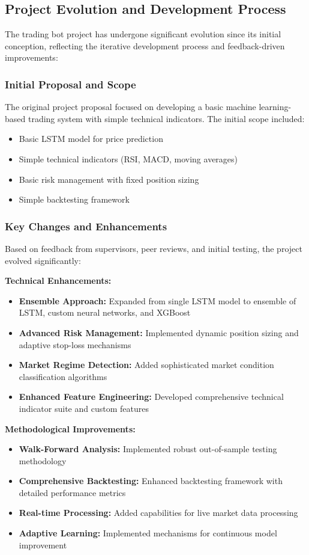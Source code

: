 \documentclass[conference]{IEEEtran}
\begin{document}
\subsection{Project Evolution and Development Process}
The trading bot project has undergone significant evolution since its initial conception, reflecting the iterative development process and feedback-driven improvements:

\subsubsection{Initial Proposal and Scope}
The original project proposal focused on developing a basic machine learning-based trading system with simple technical indicators. The initial scope included:
\begin{itemize}
    \item Basic LSTM model for price prediction
    \item Simple technical indicators (RSI, MACD, moving averages)
    \item Basic risk management with fixed position sizing
    \item Simple backtesting framework
\end{itemize}

\subsubsection{Key Changes and Enhancements}
Based on feedback from supervisors, peer reviews, and initial testing, the project evolved significantly:

\textbf{Technical Enhancements:}
\begin{itemize}
    \item \textbf{Ensemble Approach:} Expanded from single LSTM model to ensemble of LSTM, custom neural networks, and XGBoost
    \item \textbf{Advanced Risk Management:} Implemented dynamic position sizing and adaptive stop-loss mechanisms
    \item \textbf{Market Regime Detection:} Added sophisticated market condition classification algorithms
    \item \textbf{Enhanced Feature Engineering:} Developed comprehensive technical indicator suite and custom features
\end{itemize}

\textbf{Methodological Improvements:}
\begin{itemize}
    \item \textbf{Walk-Forward Analysis:} Implemented robust out-of-sample testing methodology
    \item \textbf{Comprehensive Backtesting:} Enhanced backtesting framework with detailed performance metrics
    \item \textbf{Real-time Processing:} Added capabilities for live market data processing
    \item \textbf{Adaptive Learning:} Implemented mechanisms for continuous model improvement
\end{itemize}
\end{document}
